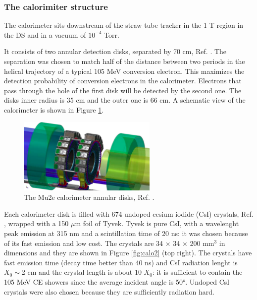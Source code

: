 \subsubsection{The calorimiter structure}
The calorimeter sits downstream of the straw tube tracker in the 1 T 
region in the DS and in a vacuum of $10^{-4}$ Torr. 

It consists of two annular detection disks, separated by 70 cm, Ref. \cite{em7}. 
The separation was chosen to match half of the distance between two 
periods in the helical trajectory of a
typical 105 MeV conversion electron. This maximizes the detection probability 
of conversion electrons in the
calorimeter. Electrons that pass through the hole of the first disk will be 
detected by the second one.
The disks inner radius is 35 cm and the outer one is 66 cm. 
A schematic view of the calorimeter is shown in Figure \ref{fig:calo1}.

\begin{figure}[!h]
    \centering
    \includegraphics[width =0.6\textwidth]{figures/png/Screenshot_20240322_122050.png}
    \caption{The Mu2e calorimeter annular disks, Ref. \cite{em7}.}
    \label{fig:calo1}
\end{figure}

Each calorimeter disk is filled with 674 undoped cesium iodide (CsI) crystals, 
Ref. \cite{em6}, wrapped with a 150 $\mu$m foil of Tyvek. 
Tyvek is pure CsI, with a wavelenght peak emission at 315 nm and a 
scintillation time of 20 ns: it was chosen because of its
fast emission and low cost. The crystals are 34 $\times$ 34 $\times$ 200 mm$^3$ 
in dimensions and they are shown in Figure \ref{fig:calo2} (top right). 
The crystals have fast emission time (decay time better than 40 ns) and CsI radiation 
lenght is $X_0 \sim $2 cm and the crystal length is about 10 $X_0$:
it is sufficient to contain the 105 MeV CE showers since the average incident angle is 50°. 
Undoped CsI crystals were also chosen because they are sufficiently radiation hard.

